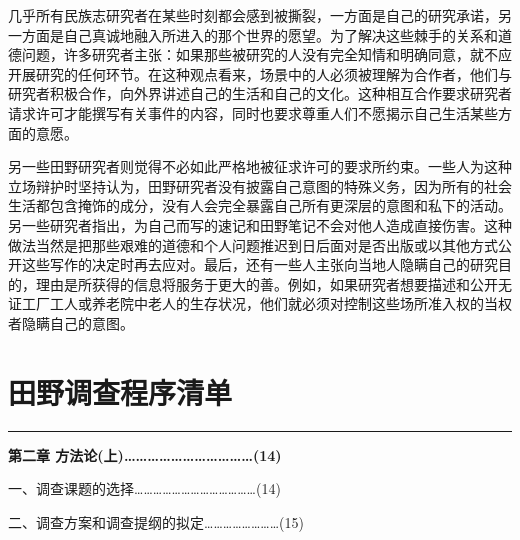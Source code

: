\documentclass[12pt,a4paper]{article}
\begin{document}
几乎所有民族志研究者在某些时刻都会感到被撕裂，一方面是自己的研究承诺，另一方面是自己真诚地融入所进入的那个世界的愿望。为了解决这些棘手的关系和道德问题，许多研究者主张：如果那些被研究的人没有完全知情和明确同意，就不应开展研究的任何环节。在这种观点看来，场景中的人必须被理解为合作者，他们与研究者积极合作，向外界讲述自己的生活和自己的文化。这种相互合作要求研究者请求许可才能撰写有关事件的内容，同时也要求尊重人们不愿揭示自己生活某些方面的意愿。



另一些田野研究者则觉得不必如此严格地被征求许可的要求所约束。一些人为这种立场辩护时坚持认为，田野研究者没有披露自己意图的特殊义务，因为所有的社会生活都包含掩饰的成分，没有人会完全暴露自己所有更深层的意图和私下的活动。另一些研究者指出，为自己而写的速记和田野笔记不会对他人造成直接伤害。这种做法当然是把那些艰难的道德和个人问题推迟到日后面对是否出版或以其他方式公开这些写作的决定时再去应对。最后，还有一些人主张向当地人隐瞒自己的研究目的，理由是所获得的信息将服务于更大的善。例如，如果研究者想要描述和公开无证工厂工人或养老院中老人的生存状况，他们就必须对控制这些场所准入权的当权者隐瞒自己的意图。
\par{}
\newpage
\section{田野调查程序清单}
\vspace{0.5em}
\vspace{0.3em}

\noindent\rule{\textwidth}{0.4pt}

\vspace{0.3em}



\vspace{0.3em}\textbf{第二章 方法论(上)……………………………(14)}



\noindent\hspace{1em}一、调查课题的选择…………………………………(14)



\noindent\hspace{1em}二、调查方案和调查提纲的拟定……………………(15)
\end{document}

